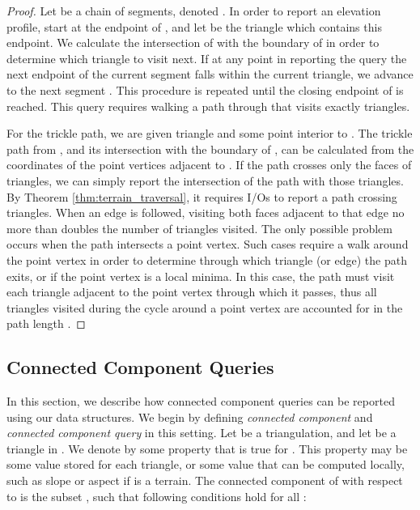   \begin{proof}
  Let  be a chain of  segments, denoted . 
  In order to report an elevation profile, start at the endpoint of , and 
  let  be the triangle which contains this endpoint. 
  We calculate the intersection of  with the boundary of  in order to determine 
  which triangle to visit next. 
  If at any point in reporting the query the next endpoint of the current segment 
   falls within the current triangle, we advance to the next segment 
  . 
  This procedure is repeated until the closing endpoint of  is reached.
  This query requires walking a path through  that visits exactly  triangles.

  For the trickle path, we are given triangle  and some point interior to . 
  The trickle path from , and its intersection with the boundary of , 
  can be calculated from the coordinates of the point vertices adjacent to . 
  If the path crosses only the faces of triangles, we can simply report the 
  intersection of the path with those triangles.
  By Theorem \ref{thm:terrain_traversal}, it 
  requires  I/Os to report a path crossing  triangles. 
  When an edge is followed, visiting both faces adjacent to that edge no more 
  than doubles the number of triangles visited. 
  The only possible problem occurs when the path intersects a point vertex. 
  Such cases require a walk around the point vertex in order to determine 
  through which triangle 
  (or edge) the path exits, or if the point vertex is a local minima. 
  In this case, the path must visit each triangle adjacent to the point vertex 
  through which it passes, thus all triangles visited during the cycle around a 
  point vertex are accounted for in the path length .
  \end{proof}

\subsection{Connected Component Queries}\label{sec:con_comp_queries}


  In this section, we describe how connected component queries can be reported 
  using our data structures. 
  We begin by defining \emph{connected component} and \emph{connected
  component query} in this setting.
  Let  be a triangulation, and let  be a triangle in . 
  We denote by  some property that is true for .
  This property may be some value stored for each triangle, or some value that
  can be computed locally, such as slope or aspect if  is a terrain.
  The connected component of  with respect to  is the 
  subset , such that following conditions hold for
  all :

